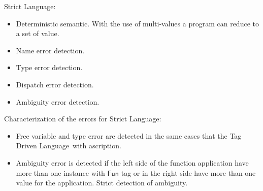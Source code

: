 \documentclass[preprint,authoryear,sort&compress,9pt,nocopyrightspace]{article}
\newcommand{\funt}{\mathsf{Fun}}
\newcommand{\semanticB}{Tag Driven Language}
\newcommand{\semanticC}{Strict Language}
\begin{document}
\semanticC:
\begin{itemize}\item Deterministic semantic. With the use of multi-values a program can reduce to a set of value.
\item Name error detection.
\item Type error detection.
\item Dispatch error detection.
\item Ambiguity error detection.
\end{itemize}
Characterization of the errors for \semanticC:
\begin{itemize}
\item Free variable and type error are detected in the same cases that the \semanticB \ with ascription.
\item Ambiguity error is detected if the left side of the function application  have more than one instance with $\funt$ tag or in the right side have more than one value for the application. Strict detection of ambiguity. 
\end{itemize}
\end{document}

